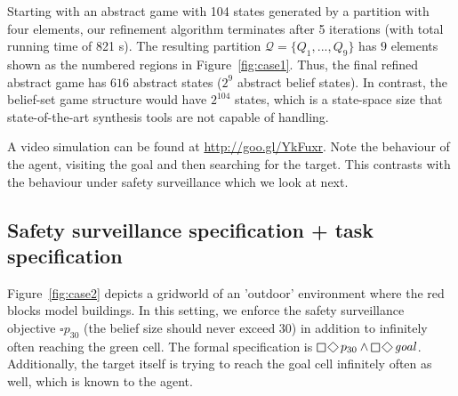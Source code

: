 
Starting with an abstract game with 104 states generated by a partition with four elements, our refinement algorithm terminates after 5 iterations (with total running time of 821 s). The resulting partition $\mathcal{Q} = \{Q_1,...,Q_9 \}$ has $9$ elements shown as the numbered regions in Figure~\ref{fig:case1}. Thus, the final refined abstract game has $616$ abstract states ($2^9$ abstract belief states). In contrast, the belief-set game structure would have $2^{104}$ states, which is a state-space size that state-of-the-art synthesis tools are not capable of handling.



A video simulation can be found at \url{http://goo.gl/YkFuxr}. Note the behaviour of the agent, visiting the goal and then searching for the target. This contrasts with the behaviour under safety surveillance which we look at next.

\subsection{Safety surveillance specification + task specification}
Figure~\ref{fig:case2} depicts a gridworld of an 'outdoor' environment where the red blocks model buildings. 
In this setting, we enforce the safety surveillance objective $\square p_{30}$ (the belief size should never exceed 30) in addition to infinitely often reaching the green cell. The formal specification is $\LTLglobally\LTLfinally p_{30} \wedge \LTLglobally\LTLfinally \mathit{goal}$. Additionally, the target itself is trying to reach the goal cell infinitely often as well, which is known to the agent.

